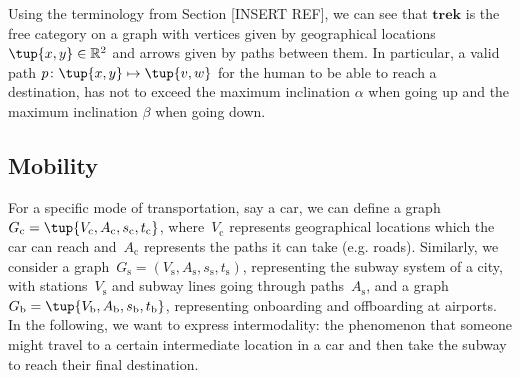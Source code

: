 

Using the terminology from Section [INSERT REF], we can see that $\mathbf{trek}$ is the free category on a graph with vertices given by geographical locations $\tup{x,y}\in \mathbb{R}^2$ and arrows given by paths between them. In particular, a valid path $p\colon \tup{x,y}\mapsto \tup{v,w}$ for the human to be able to reach a destination, has not to exceed the maximum inclination $\alpha$ when going up and the maximum inclination $\beta$ when going down.


\subsection{Mobility}

For a specific mode of transportation, say a car, we can define a graph~$G_\mathrm{c}=\tup{V_\mathrm{c},A_\mathrm{c},s_\mathrm{c},t_\mathrm{c}}$, where~$V_\mathrm{c}$ represents geographical locations which the car can reach and~$A_\mathrm{c}$ represents the paths it can take (e.g. roads). Similarly, we consider a graph~$G_\mathrm{s}=(V_\mathrm{s},A_\mathrm{s},s_\mathrm{s},t_\mathrm{s})$, representing the subway system of a city, with stations~$V_\mathrm{s}$ and subway lines going through paths~$A_\mathrm{s}$, and a graph $G_\mathrm{b}=\tup{V_\mathrm{b},A_\mathrm{b},s_\mathrm{b},t_\mathrm{b}}$, representing onboarding and offboarding at airports. In the following, we want to express intermodality: the phenomenon that someone might travel to a certain intermediate location in a car and then take the subway to reach their final destination. 

